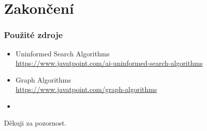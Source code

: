 \documentclass{beamer}
\begin{document}
\section{Zakončení}

\begin{frame}
    \frametitle{Použité zdroje}
    \begin{itemize}
        \item Uninformed Search Algorithms \\ \url{https://www.javatpoint.com/ai-uninformed-search-algorithms}
        \item Graph Algorithms \\ \url{https://www.javatpoint.com/graph-algorithms}
        \item
    \end{itemize}
\end{frame}

\begin{frame}

    \begin{center}
        \Large{Děkuji za pozornost.}
    \end{center}

\end{frame}
\end{document}
